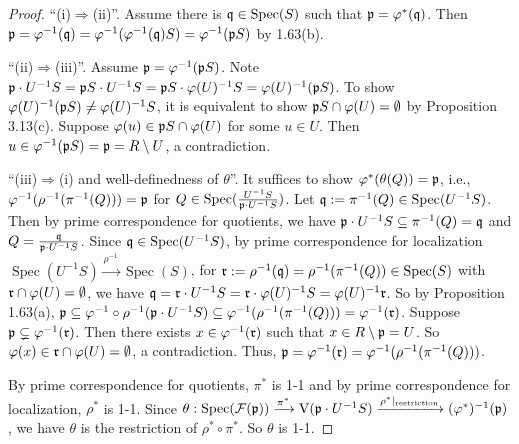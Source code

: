 \begin{proof}
    ``(i)$\Rightarrow$(ii)''. Assume there is $\mathfrak{q} \in \operatorname{Spec}(S)$ such that $\mathfrak{p} = \varphi^*(\mathfrak{q})$. Then $\mathfrak{p} = \varphi^{-1}(\mathfrak{q}) = \varphi^{-1}(\varphi^{-1}(\mathfrak{q})S) = \varphi^{-1}(\mathfrak{p} S)$ by 1.63(b). \par 
    ``(ii)$\Rightarrow$(iii)''. Assume $\mathfrak{p} = \varphi^{-1}(\mathfrak{p} S)$. Note $\mathfrak{p} \cdot U^{-1}S = \mathfrak{p} S \cdot U^{-1}S = \mathfrak{p} S \cdot \varphi(U)^{-1}S = \varphi(U)^{-1} (\mathfrak{p} S)$. To show $\varphi(U)^{-1}(\mathfrak{p} S) \neq \varphi(U)^{-1}S$, it is equivalent to show $\mathfrak{p} S \cap \varphi(U) = \emptyset$ by Proposition 3.13(c). Suppose $\varphi(u) \in \mathfrak{p} S \cap \varphi(U)$ for some $u \in U$. Then $u \in \varphi^{-1}(\mathfrak{p} S) = \mathfrak{p} = R \setminus U$, a contradiction. \par 
    ``(iii)$\Rightarrow$(i) and well-definedness of $\theta$''. It suffices to show $\varphi^{*}(\theta(Q)) = \mathfrak{p}$, i.e., $\varphi^{-1}(\rho^{-1}(\pi^{-1}(Q))) = \mathfrak{p}$ for $Q \in \operatorname{Spec}(\frac{U^{-1}S}{\mathfrak{p} \cdot U^{-1}S})$. Let $\mathfrak{q} := \pi^{-1}(Q) \in \operatorname{Spec}(U^{-1}S)$. Then by prime correspondence for quotients, we have $\mathfrak{p} \cdot U^{-1} S \subseteq \pi^{-1}(Q) = \mathfrak{q}$ and $Q = \frac{\mathfrak{q}}{\mathfrak{p} \cdot U^{-1}S}$. Since $\mathfrak{q} \in \operatorname{Spec}(U^{-1}S)$, by prime correspondence for localization $\operatorname{Spec}(U^{-1}S) \xrightarrow{\rho^{-1}} \operatorname{Spec}(S)$, for $\mathfrak{r} := \rho^{-1}(\mathfrak{q}) = \rho^{-1}(\pi^{-1}(Q)) \in \operatorname{Spec}(S)$ with $\mathfrak{r} \cap \varphi(U) = \emptyset$, we have $\mathfrak{q} = \mathfrak{r} \cdot U^{-1}S = \mathfrak{r} \cdot \varphi(U)^{-1}S = \varphi(U)^{-1}\mathfrak{r}$. So by Proposition 1.63(a), $\mathfrak{p} \subseteq \varphi^{-1} \circ \rho^{-1}(\mathfrak{p} \cdot U^{-1}S) \subseteq \varphi^{-1}(\rho^{-1}(\pi^{-1}(Q))) = \varphi^{-1}(\mathfrak{r})$. Suppose $\mathfrak{p} \subsetneq \varphi^{-1}(\mathfrak{r})$. Then there exists $x \in \varphi^{-1}(\mathfrak{r})$ such that $x \in R \setminus \mathfrak{p} = U$. So $\varphi(x) \in \mathfrak{r} \cap \varphi(U) = \emptyset$, a contradiction. Thus, $\mathfrak{p} = \varphi^{-1}(\mathfrak{r}) = \varphi^{-1}(\rho^{-1}(\pi^{-1}(Q)))$. \par 
    By prime correspondence for quotients, $\pi^{*}$ is 1-1 and by prime correspondence for localization, $\rho^{*}$ is 1-1. Since $\theta: \operatorname{Spec}(\mathcal{F}(\mathfrak{p})) \xrightarrow{\pi^{*}} \operatorname{V}(\mathfrak{p} \cdot U^{-1}S) \xrightarrow{\rho^{*}|_{\text{restriction}}} (\varphi^{*})^{-1}(\mathfrak{p})$, we have $\theta$ is the restriction of $\rho^{*} \circ \pi^{*}$. So $\theta$ is 1-1. \par 

\end{proof}
